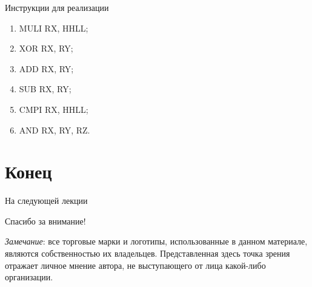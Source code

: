\begin{frame}{Инструкции для реализации}
\begin{enumerate}
    \item MULI RX, HHLL;
    \item XOR RX, RY;
    \item ADD RX, RY;
    \item SUB RX, RY;
    \item CMPI RX, HHLL;
    \item AND RX, RY, RZ.
\end{enumerate}
\end{frame}
\fi

\section*{Конец}

\ifilab\else
\begin{frame}{На следующей лекции}
\end{frame}
\fi

\begin{frame}

{\huge{Спасибо за внимание!}\par}

\vfill

\tiny{\textit{Замечание}: все торговые марки и логотипы, использованные в данном материале, являются собственностью их владельцев. Представленная здесь точка зрения отражает личное мнение автора, не выступающего от лица какой-либо организации.}

\end{frame}


